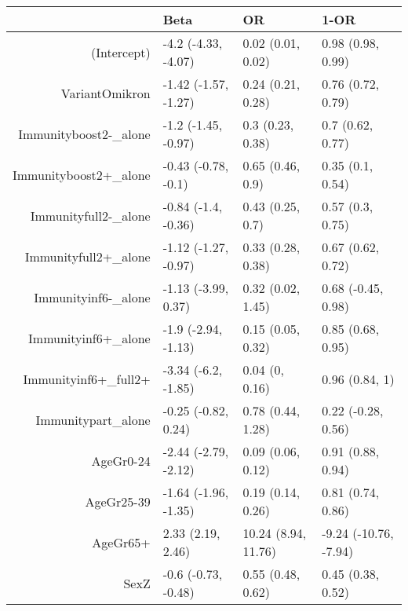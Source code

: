 \begin{table}[ht]
\centering
\begin{tabular}{rlll}
  \hline
 & Beta & OR & 1-OR \\ 
  \hline
(Intercept) & -4.2 (-4.33, -4.07) & 0.02 (0.01, 0.02) & 0.98 (0.98, 0.99) \\ 
  VariantOmikron & -1.42 (-1.57, -1.27) & 0.24 (0.21, 0.28) & 0.76 (0.72, 0.79) \\ 
  Immunityboost2-\_alone & -1.2 (-1.45, -0.97) & 0.3 (0.23, 0.38) & 0.7 (0.62, 0.77) \\ 
  Immunityboost2+\_alone & -0.43 (-0.78, -0.1) & 0.65 (0.46, 0.9) & 0.35 (0.1, 0.54) \\ 
  Immunityfull2-\_alone & -0.84 (-1.4, -0.36) & 0.43 (0.25, 0.7) & 0.57 (0.3, 0.75) \\ 
  Immunityfull2+\_alone & -1.12 (-1.27, -0.97) & 0.33 (0.28, 0.38) & 0.67 (0.62, 0.72) \\ 
  Immunityinf6-\_alone & -1.13 (-3.99, 0.37) & 0.32 (0.02, 1.45) & 0.68 (-0.45, 0.98) \\ 
  Immunityinf6+\_alone & -1.9 (-2.94, -1.13) & 0.15 (0.05, 0.32) & 0.85 (0.68, 0.95) \\ 
  Immunityinf6+\_full2+ & -3.34 (-6.2, -1.85) & 0.04 (0, 0.16) & 0.96 (0.84, 1) \\ 
  Immunitypart\_alone & -0.25 (-0.82, 0.24) & 0.78 (0.44, 1.28) & 0.22 (-0.28, 0.56) \\ 
  AgeGr0-24 & -2.44 (-2.79, -2.12) & 0.09 (0.06, 0.12) & 0.91 (0.88, 0.94) \\ 
  AgeGr25-39 & -1.64 (-1.96, -1.35) & 0.19 (0.14, 0.26) & 0.81 (0.74, 0.86) \\ 
  AgeGr65+ & 2.33 (2.19, 2.46) & 10.24 (8.94, 11.76) & -9.24 (-10.76, -7.94) \\ 
  SexZ & -0.6 (-0.73, -0.48) & 0.55 (0.48, 0.62) & 0.45 (0.38, 0.52) \\ 
   \hline
\end{tabular}
\end{table}
